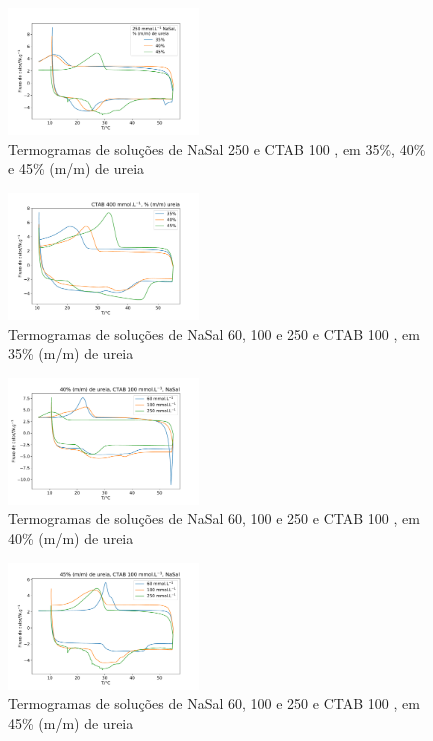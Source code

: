 		\begin{figure}[h]
			\centering
			\includegraphics[width=0.45\textwidth]{./imagens/dsc/NaSal250}
			\caption{Termogramas de soluções de NaSal 250\mM{} e CTAB 100 \mM{}, em 35\%, 40\% e 45\% (m/m) de ureia}
			\label{fig:DSC_NaSal250}
		\end{figure}
	
		\begin{figure}[h]
			\centering
			\includegraphics[width=0.45\textwidth]{./imagens/dsc/NaSal35}
			\caption{Termogramas de soluções de NaSal 60, 100 e 250\mM{} e CTAB 100 \mM{}, em 35\% (m/m) de ureia}
			\label{fig:DSC_NaSal_Ur35}
		\end{figure}
	
		\begin{figure}[h]
			\centering
			\includegraphics[width=0.45\textwidth]{./imagens/dsc/NaSal40}
			\caption{Termogramas de soluções de NaSal 60, 100 e 250\mM{} e CTAB 100 \mM{}, em 40\% (m/m) de ureia}
			\label{fig:DSC_NaSal_Ur40}
		\end{figure}

		\begin{figure}[h]
			\centering
			\includegraphics[width=0.45\textwidth]{./imagens/dsc/NaSal45}
			\caption{Termogramas de soluções de NaSal 60, 100 e 250\mM{} e CTAB 100 \mM{}, em 45\% (m/m) de ureia}
			\label{fig:DSC_NaSal_Ur45}
		\end{figure}

